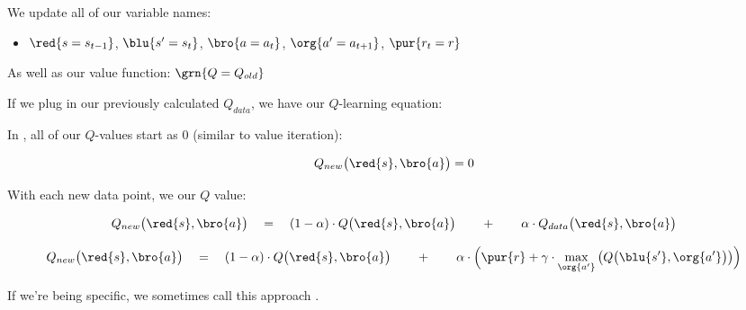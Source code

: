         \begin{notation}
            We update all of our variable names:

            \begin{itemize}
                \item $\red{s=s_{t-1}}$, $\blu{s'=s_t}$, $\bro{a=a_t}$, $\org{a'=a_{t+1}}$, $\pur{r_t=r}$
            \end{itemize}
             
                
            As well as our value function: $\grn{Q=Q_{old}}$
        \end{notation}

        If we plug in our previously calculated $Q_{data}$, we have our $Q$-learning equation:\\

        \begin{kequation}
            In , all of our $Q$-values start as 0 (similar to value iteration):

            \begin{equation*}
                Q_{new}\big(\red{s},\bro{a} \big) = 0
            \end{equation*}

            With each new data point, we  our $Q$ value:

            \begin{equation*}
                Q_{new}\big(\red{s},\bro{a} \big) \quad=\quad  
                (1-\alpha) \cdot Q\big(\red{s},\bro{a} \big)
                \qquad+\qquad 
                \alpha \cdot Q_{data}\big(\red{s},\bro{a} \big)
            \end{equation*}

            \begin{equation*}
                Q_{new}\big(\red{s},\bro{a} \big) \quad=\quad
                    (1-\alpha) \cdot Q\big(\red{s},\bro{a} \big)
                    \qquad+\qquad
                \alpha \cdot 
                \Big( \pur{r}
                    +
                    \gamma \cdot
                    \max_{\org{a'}} 
                        \big( Q\big(\blu{s'},\org{a'} \big) \big) 
                \Big)
            \end{equation*}

            If we're being specific, we sometimes call this approach .
        \end{kequation}

    \phantom{}

